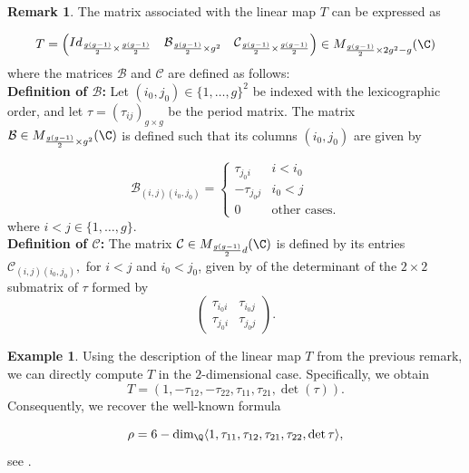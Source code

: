\documentclass[11pt,leqno]{article}
\theoremstyle{definition}
\newtheorem{remark}{Remark}[section]
\newtheorem{example}{Example}[section]
\begin{document}
\begin{remark}
The matrix associated with the linear map $T$ can be expressed as

 \begin{equation*}
    T=\begin{pmatrix}
        Id_{\frac{g(g-1)}{2}\times \frac{g(g-1)}{2}} & \mathcal{B}_{\frac{g(g-1)}{2}\times g^2} & \mathcal{C}_{\frac{g(g-1)}{2}\times \frac{g(g-1)}{2}} 
    \end{pmatrix}
    \in M_{\frac{g(g-1)}{2}\times 2g^2-g}(\C)
\end{equation*}
 where the matrices $\mathcal{B}$ and $\mathcal{C}$ are defined as follows: \\
 

\noindent\textbf{Definition of $\mathcal{B}$:} Let $(i_0,j_0)\in \{1,\dots,g\}^2$ be indexed with the lexicographic order, and let $\tau=(\tau_{ij})_{g\times g}$ be the period matrix. The matrix $\mathcal{B}\in M_{\frac{g(g-1)}{2}\times g^2}(\C)$ is defined such that its columns $(i_0,j_0)$ are given by 
    
    \begin{equation*}
\mathcal{B}_{(i,j)(i_0,j_0)} = \left\lbrace
\begin{array}{ll}
\tau_{j_0i} & i<i_0 \\
-\tau_{j_0j}  & i_0<j\\
0 & \text{other cases.}
\end{array}
\right.
\end{equation*}
where $i<j\in \{1,\dots,g\}$.\\


\noindent\textbf{Definition of $\mathcal{C}$:} The matrix $\mathcal{C}\in M_{\frac{g(g-1)}{2}d}(\C)$ is defined by its entries $\mathcal{C}_{(i,j)(i_0,j_0)},$ for $i<j$ and $i_0<j_0$, given by of the determinant of the $2\times 2$ submatrix of $\tau$ formed by 
\begin{equation*}
    \begin{pmatrix}
        \tau_{i_0i} & \tau_{i_0j} \\
         \tau_{j_0i} & \tau_{j_0j}
    \end{pmatrix}.
\end{equation*}   
\end{remark}

\begin{example}
Using the description of the linear map $T$ from the previous remark, we can directly compute $T$ in the $2$-dimensional case. Specifically, we obtain
$$T=(1,-\tau_{12},-\tau_{22},\tau_{11},\tau_{21},\det (\tau)).$$
Consequently, we recover the well-known formula

$$\rho= 6-\dim_{\Q} \langle 1,\tau_{11},\tau_{12},\tau_{21},\tau_{22},\det \tau\rangle,$$ 
see \cite[$\S$2.7]{birkenhake1999complex}.  
\end{example}
\end{document}
